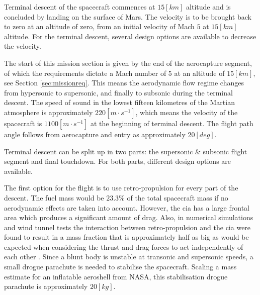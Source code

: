Terminal descent of the spacecraft commences at $15 [km]$ altitude and is concluded by landing on the surface of Mars. The velocity is to be brought back to zero at an altitude of zero, from an initial velocity of Mach $5$ at $15 [km]$ altitude. For the terminal descent, several design options are available to decrease the velocity.%

The start of this mission section is given by the end of the aerocapture segment, of which the requirements dictate a Mach number of 5 at an altitude of $15 \left[km\right]$, see Section \ref{sec:missionreq}. This means the aerodynamic flow regime changes from hypersonic to supersonic, and finally to subsonic during the terminal descent. The speed of sound in the lowest fifteen kilometres of the Martian atmosphere is approximately $220 \left[m\cdot s^{-1}\right]$, which means the velocity of the spacecraft is $1100 \left[m\cdot s^{-1}\right]$ at the beginning of terminal descent. The flight path angle follows from aerocapture and entry as approximately $20 \left[deg\right]$.%

Terminal descent can be split up in two parts: the supersonic \& subsonic flight segment and final touchdown. For both parts, different design options are available.

The first option for the flight is to use retro-propulsion for every part of the descent. The fuel mass would be $23.3\%$ of the total spacecraft mass if no aerodynamic effects are taken into account. However, the \gls{cia} has a large frontal area which produces a significant amount of drag. Also, in numerical simulations and wind tunnel tests the interaction between retro-propulsion and the \gls{cia} were found to result in a mass fraction that is approximately half as big as would be expected when considering the thrust and drag forces to act independently of each other \cite{Korzun2009}. Since a blunt body is unstable at transonic and supersonic speeds, a small drogue parachute is needed to stabilise the spacecraft. Scaling a mass estimate for an inflatable aeroshell from NASA, this stabilisation drogue parachute is approximately $20 [kg]$.

